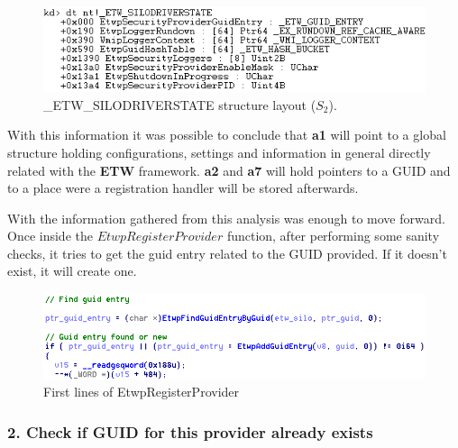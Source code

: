   \begin{centering}
  \begin{figure}[H]
    \includegraphics[width=12cm]{images/ETW_SILODRIVERSTATE_structure.png}
    \caption[]{\_ETW\_SILODRIVERSTATE structure layout ($S_2$).}
    \label{fig:etwsilodriverstate_structure}
  \end{figure}
  \end{centering}

  With this information it was possible to conclude that {\bfseries a1} will point to a global structure holding configurations, settings and information in general directly related with the {\bfseries ETW} framework. {\bfseries a2} and {\bfseries a7} will hold pointers to a GUID and to a place were a registration handler will be stored afterwards. 

  With the information gathered from this analysis was enough to move forward.\\


 Once inside the $EtwpRegisterProvider$ function, after performing some sanity checks, it tries to get the guid entry related to the GUID provided. If it doesn't exist, it will create one. 
  
  \begin{centering}
  \begin{figure}[H]
    \includegraphics[width=15cm]{images/etwpregisterProvider.png}
    \caption[]{First lines of EtwpRegisterProvider}
    \label{fig:etwpregisterProvider}
  \end{figure}
  \end{centering}



  \subsubsection{\bfseries{2. Check if GUID for this provider already exists}}
 
